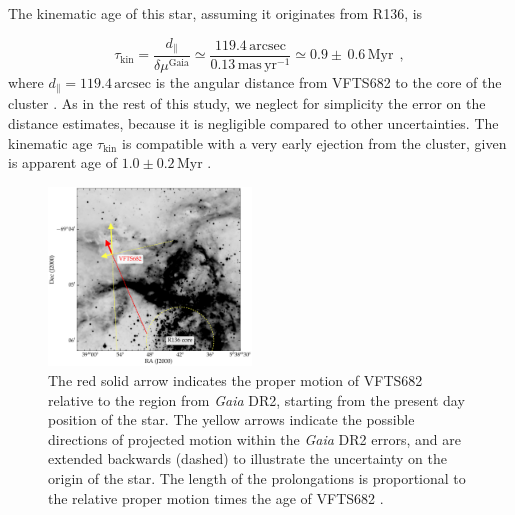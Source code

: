 \documentclass[apjl,twocolumn]{emulateapj}
\newcommand{\todo}[1]{{\large $\blacksquare$~\textbf{\color{red}[#1]}}~$\blacksquare$}
\newcommand{\masyr}{\,\mathrm{mas}\,\mathrm{yr}^{-1}}
\begin{document}
The kinematic age of this star, assuming it originates from R136, is

\begin{equation}
  \label{eq:kin_age}
  \tau_\mathrm{kin} = \frac{d_\parallel}{\delta\mu^\mathrm{Gaia}} \simeq
  \frac{119.4\,\mathrm{arcsec}}{0.13\masyr} \simeq 0.9\pm\,0.6\, \mathrm{Myr} \ \ ,
\end{equation}
where $d_\parallel = 119.4\,\mathrm{arcsec}$ is the angular distance from VFTS682 to
the core of the cluster \citep[corresponding to $\sim$29\,pc at LMC distance,][]{bestenlehner:11}.
As in the rest of this study, we neglect for
simplicity the error on the distance estimates, because it is negligible compared to other uncertainties.
The kinematic age $\tau_\mathrm{kin}$ is compatible with a very early
ejection from the cluster, given is apparent age
of $1.0\pm 0.2$\,Myr \citep{schneider:18}. %




\begin{figure}%
  \centering
  \includegraphics[width=0.48\textwidth]{./figures/main_plot_good_gaia_only}  
  \caption{The red solid arrow indicates the proper motion of VFTS682
    relative to the region from \emph{Gaia} DR2, starting from the present day position of
    the star. The yellow arrows indicate the possible
    directions of projected motion within the \emph{Gaia} DR2 errors, and are extended
    backwards (dashed) to illustrate the uncertainty on the origin of the
    star. The length of the prolongations is proportional to the relative proper motion
    times the age of VFTS682 \citep[$1.0\pm0.2$\,Myr,][]{schneider:18}.
  }
  
  \label{fig:main}
\end{figure}
\end{document}
